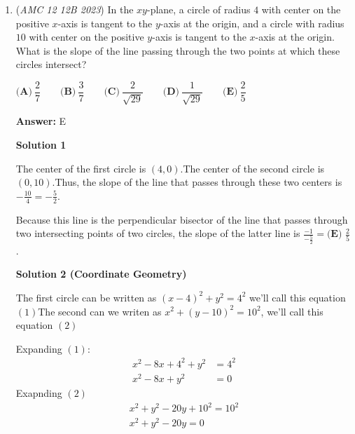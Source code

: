 \begin{enumerate}
 So we have $2\times 4$ which is $\boxed{\text{(B) 8}}$.

 



\textbf{Solution 5 (Desperate)}

There are $2$ sets of $2$ absolute value bars. Each of those $2$ absolute value bars can take on $2$ values, so we have $2 \cdot 2 \cdot 2 = 8$ cases. We guess that the answer is divisible by $8$. The only answer choice that is divisible by $8$ is $\boxed{\text{(B)}~8}$.

 


	\item (\textit{AMC 12 12B 2023}) In the $xy$-plane, a circle of radius $4$ with center on the positive $x$-axis is tangent to the $y$-axis at the origin, and a circle with radius $10$ with center on the positive $y$-axis is tangent to the $x$-axis at the origin. What is the slope of the line passing through the two points at which these circles intersect?


 $\textbf{(A)}\ \dfrac{2}{7} \qquad\textbf{(B)}\ \dfrac{3}{7}  \qquad\textbf{(C)}\ \dfrac{2}{\sqrt{29}}  \qquad\textbf{(D)}\ \dfrac{1}{\sqrt{29}}  \qquad\textbf{(E)}\ \dfrac{2}{5}$

 \textbf{Answer: }E



\textbf{Solution 1}

The center of the first circle is $(4,0)$.The center of the second circle is $(0,10)$.Thus, the slope of the line that passes through these two centers is $- \frac{10}{4} = - \frac{5}{2}$.

 Because this line is the perpendicular bisector of the line that passes through two intersecting points of two circles, the slope of the latter line is $\frac{-1}{- \frac{5}{2}} = \boxed{\textbf{(E) } \frac{2}{5}}$.

 



\textbf{Solution 2 (Coordinate Geometry)}

The first circle can be written as $(x-4)^2 + y^2 = 4^2$ we'll call this equation $(1)$The second can we writen as $x^2 + (y-10)^2 = 10^2$, we'll call this equation $(2)$

 Expanding $(1)$:
 \begin{align*} x^2 -8x + 4^2 + y^2 &= 4^2 \\ x^2 - 8x + y^2 &= 0 \end{align*}
Exapnding $(2)$
 \begin{align*} x^2 + y^2 -20y + 10^2 = 10^2\\ x^2 + y^2 - 20y = 0 \end{align*}



\end{enumerate}
